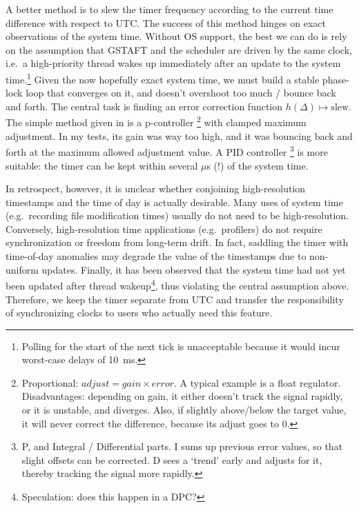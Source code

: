 \documentclass[a4paper,12pt,pdftex]{article}
\begin{document}
A better method is to slew the timer frequency according to the current time difference with respect to UTC. The success of this method hinges on exact observations of the system time. Without OS support, the best we can do is rely on the assumption that GSTAFT and the scheduler are driven by the same clock, i.e.\ a high-priority thread wakes up immediately after an update to the system time.\footnote{Polling for the start of the next tick is unacceptable because it would incur worst-case delays of 10~ms.} Given the now hopefully exact system time, we must build a stable phase-lock loop that converges on it, and doesn't overshoot too much / bounce back and forth. \citep{precTime} The central task is finding an error correction function $h(\Delta) \mapsto \mathrm{slew}$. The simple method given in \citep{tclTimer} is a p-controller \footnote{Proportional: $\mathit{adjust} = \mathit{gain} \times \mathit{error}$. A typical example is a float regulator. Disadvantages: depending on gain, it either doesn't track the signal rapidly, or it is unstable, and diverges. Also, if slightly above/below the target value, it will never correct the difference, because its adjust goes to 0.} with clamped maximum adjustment. In my tests, its gain was way too high, and it was bouncing back and forth at the maximum allowed adjustment value. A PID controller \footnote{P, and Integral / Differential parts. I sums up previous error values, so that slight offsets can be corrected. D sees a `trend' early and adjusts for it, thereby tracking the signal more rapidly.} is more suitable: the timer can be kept within several $\mu$s (!) of the system time.

In retrospect, however, it is unclear whether conjoining high-resolution timestamps and the time of day is actually desirable. Many uses of system time (e.g.\ recording file modification times) usually do not need to be high-resolution. Conversely, high-resolution time applications (e.g.\ profilers) do not require synchronization or freedom from long-term drift. In fact, saddling the timer with time-of-day anomalies may degrade the value of the timestamps due to non-uniform updates. Finally, it has been observed that the system time had not yet been updated after thread wakeup\footnote{Speculation: does this happen in a DPC?}, thus violating the central assumption above. Therefore, we keep the timer separate from UTC and transfer the responsibility of synchronizing clocks to users who actually need this feature.

{}


\end{document}
